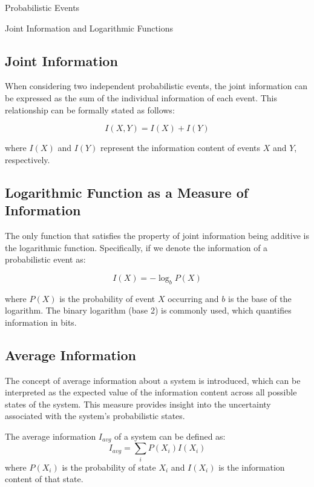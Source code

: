 \documentclass[12pt,a4paper]{article}
\newenvironment{defbox}[1][]{%
  \begin{tcolorbox}[enhanced, breakable, colback=defcolor, colframe=green!50!black, title=#1, fonttitle=\bfseries, arc=3pt, boxrule=0.5pt]
}{\end{tcolorbox}}
\begin{document}
\begin{section}{Probabilistic Events}
\begin{section}{Joint Information and Logarithmic Functions}
\subsection{Joint Information}
When considering two independent probabilistic events, the joint information can be expressed as the sum of the individual information of each event. This relationship can be formally stated as follows:

\begin{equation}
I(X, Y) = I(X) + I(Y)
\end{equation}

where \(I(X)\) and \(I(Y)\) represent the information content of events \(X\) and \(Y\), respectively.

\subsection{Logarithmic Function as a Measure of Information}
The only function that satisfies the property of joint information being additive is the logarithmic function. Specifically, if we denote the information of a probabilistic event as:

\begin{equation}
I(X) = -\log_b P(X)
\end{equation}

where \(P(X)\) is the probability of event \(X\) occurring and \(b\) is the base of the logarithm. The binary logarithm (base 2) is commonly used, which quantifies information in bits.

\subsection{Average Information}
The concept of average information about a system is introduced, which can be interpreted as the expected value of the information content across all possible states of the system. This measure provides insight into the uncertainty associated with the system's probabilistic states.

\begin{defbox}[Average Information]
The average information \(I_{avg}\) of a system can be defined as:
\begin{equation}
I_{avg} = \sum_{i} P(X_i) I(X_i)
\end{equation}
where \(P(X_i)\) is the probability of state \(X_i\) and \(I(X_i)\) is the information content of that state.
\end{defbox}


\end{section}
\end{section}
\end{document}
